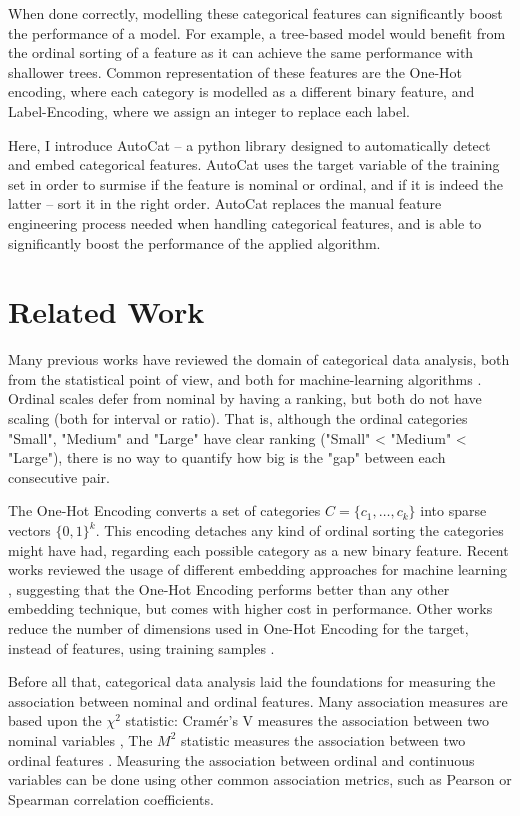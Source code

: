 \documentclass{article}
\begin{document}
When done correctly, modelling these categorical features can significantly boost the performance of a model. For example, a tree-based model would benefit from the ordinal sorting of a feature as it can achieve the same performance with shallower trees. 
Common representation of these features are the One-Hot encoding, where each category is modelled as a different binary feature, and Label-Encoding, where we assign an integer to replace each label.

Here, I introduce AutoCat -- a python library designed to automatically detect and embed categorical features. AutoCat uses the target variable of the training set in order to surmise if the feature is nominal or ordinal, and if it is indeed the latter -- sort it in the right order. AutoCat replaces the manual feature engineering process needed when handling categorical features, and is able to significantly boost the performance of the applied algorithm.

\section{Related Work}
Many previous works have reviewed the domain of categorical data analysis, both from the statistical point of view, and both for machine-learning algorithms \cite{agresti2018introduction, Stevens1946}. Ordinal scales defer from nominal by having a ranking, but both do not have scaling (both for interval or ratio). That is, although the ordinal categories "Small", "Medium" and "Large" have clear ranking ("Small" < "Medium" < "Large"), there is no way to quantify how big is the "gap" between each consecutive pair.

The One-Hot Encoding converts a set of categories $C = \{c_1, \dots, c_k\}$ into sparse vectors $\{0, 1\}^k$. This encoding detaches any kind of ordinal sorting the categories might have had, regarding each possible category as a new binary feature.
Recent works reviewed the usage of different embedding approaches for machine learning \cite{Potdar2017}, suggesting that the One-Hot Encoding performs better than any other embedding technique, but comes with higher cost in performance. 
Other works reduce the number of dimensions used in One-Hot Encoding for the target, instead of features, using training samples \cite{Rodrguez2018}.

Before all that, categorical data analysis laid the foundations for measuring the association between nominal and ordinal features. Many association measures are based upon the $\chi ^2$ statistic: Cramér's V measures the association between two nominal variables \cite{cramer1999mathematical}, The $M^2$ statistic measures the association between two ordinal features \cite{agresti2007an}. Measuring the association between ordinal and continuous variables can be done using other common association metrics, such as Pearson or Spearman correlation coefficients. 
\end{document}
